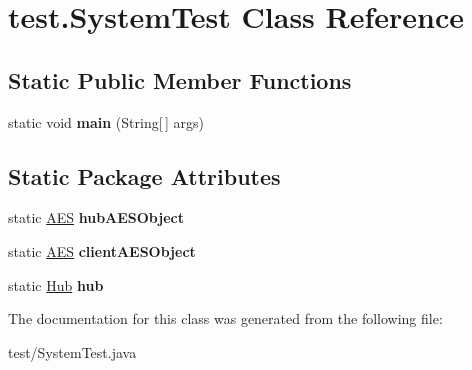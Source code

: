 \hypertarget{classtest_1_1_system_test}{
\section{test.\-System\-Test \-Class \-Reference}
\label{classtest_1_1_system_test}
}
\subsection*{\-Static \-Public \-Member \-Functions}
\begin{DoxyCompactItemize}
\item 
\hypertarget{classtest_1_1_system_test_ac7b2f34c4c71aa1b482351cf7d7242b8}{
static void {\bfseries main} (\-String\mbox{[}$\,$\mbox{]} args)}
\label{classtest_1_1_system_test_ac7b2f34c4c71aa1b482351cf7d7242b8}

\end{DoxyCompactItemize}
\subsection*{\-Static \-Package \-Attributes}
\begin{DoxyCompactItemize}
\item 
\hypertarget{classtest_1_1_system_test_aa977c845ae3de492926739c1adf8ef8b}{
static \hyperlink{classsecurity_1_1_a_e_s}{\-A\-E\-S} {\bfseries hub\-A\-E\-S\-Object}}
\label{classtest_1_1_system_test_aa977c845ae3de492926739c1adf8ef8b}

\item 
\hypertarget{classtest_1_1_system_test_abf3bed782381cb8ca4e22a538e960082}{
static \hyperlink{classsecurity_1_1_a_e_s}{\-A\-E\-S} {\bfseries client\-A\-E\-S\-Object}}
\label{classtest_1_1_system_test_abf3bed782381cb8ca4e22a538e960082}

\item 
\hypertarget{classtest_1_1_system_test_a21fabb9cddebeebf975b9b31f5396b4b}{
static \hyperlink{classhub_1_1_hub}{\-Hub} {\bfseries hub}}
\label{classtest_1_1_system_test_a21fabb9cddebeebf975b9b31f5396b4b}

\end{DoxyCompactItemize}


\-The documentation for this class was generated from the following file\-:\begin{DoxyCompactItemize}
\item 
test/\-System\-Test.\-java\end{DoxyCompactItemize}
